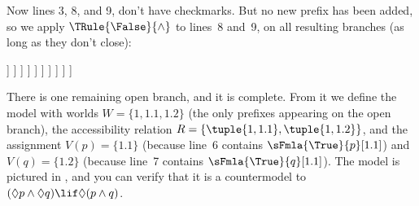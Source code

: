 \documentclass[../../../include/open-logic-section]{subfiles}
\begin{document}
{\begin{ex}
  Now lines 3, 8, and 9, don't have checkmarks. But no new prefix has
  been added, so we apply $\TRule{\False}{\land}$ to lines~8 and~9, on
  all resulting branches (as long as they don't close):
  \begin{oltableau}
    [\pFmla{\False}{(\Diamond p \land \Diamond q) \lif \Diamond(p \land q)}{1},
      just = \TAss, checked
      [\pFmla{\True}{\Diamond p \land \Diamond q}{1},
        just = {\TRule{\False}{\lif}[1]}, checked
        [\pFmla{\False}{\Diamond(p \land q)}{1},
          just = {\TRule{\False}{\lif}[1]}
          [\pFmla{\True}{\Diamond p}{1},
            just = {\TRule{\True}{\land}[2]}, checked
            [\pFmla{\True}{\Diamond q}{1},
              just = {\TRule{\True}{\land}[2]}, checked
              [\pFmla{\True}{p}{1.1}, 
                just = {\TRule{\True}{\Diamond}[4]}, checked
                [\pFmla{\True}{q}{1.2}, 
                  just = {\TRule{\True}{\Diamond}[5]}, checked
                  [\pFmla{\False}{p \land q}{1.1}, 
                    just = {\TRule{\False}{\Diamond}[3]}, checked
                    [\pFmla{\False}{p \land q}{1.2}, 
                      just = {\TRule{\False}{\Diamond}[3]}, checked
                      [\pFmla{\False}{p}{1.1},
                        just = {\TRule{\False}{\land}[8]}, checked, close
                      ]
                      [\pFmla{\False}{q}{1.1},
                        just = {\TRule{\False}{\land}[8]}, checked
                        [\pFmla{\False}{p}{1.2},
                          just = {\TRule{\False}{\land}[9]}, checked]
                        [\pFmla{\False}{q}{1.2},
                          just = {\TRule{\False}{\land}[9]}, checked, close]
                      ]
                    ]
                  ]
                ]
              ]
            ]
          ]
        ]
      ]
    ]
  \end{oltableau}
  There is one remaining open branch, and it is complete. From it we
  define the model with worlds $W = \{1, 1.1, 1.2\}$ (the only
  prefixes appearing on the open branch), the accessibility relation
  $R = \{\tuple{1, 1.1}, \tuple{1, 1.2}\}$, and the assignment $V(p) =
  \{1.1\}$ (because line~6 contains $\sFmla{\True}{p}[1.1]$) and
  $V(q) = \{1.2\}$ (because line~7 contains
  $\sFmla{\True}{q}[1.1]$). The model is pictured in
  , and you can verify that it is a
  countermodel to $(\Diamond p \land \Diamond q) \lif \Diamond (p \land q)$.
  \begin{figure}
  \begin{center}
    \begin{tikzpicture}[modal]

\end{tikzpicture}
\end{center}
\end{figure}
\end{ex}}
\end{document}
